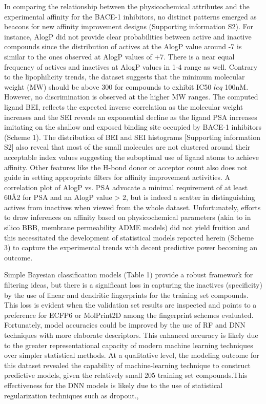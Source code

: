 In comparing the relationship between the physicochemical attributes and the experimental affinity for the BACE-1 inhibitors, no distinct patterns emerged as beacons for new affinity improvement designs (Supporting information S2).  For instance, AlogP did not provide clear probabilities between active and inactive compounds since the distribution of actives at the AlogP value around -7 is similar to the ones observed at AlogP values of +7.  There is a near equal frequency of actives and inactives at AlogP values in 1-4 range as well.  Contrary to the lipophilicity trends, the dataset suggests that the minimum molecular weight (MW) should be above 300 for compounds to exhibit IC50 $leq$ 100nM.  However, no discrimination is observed at the higher MW ranges.  The computed ligand BEI, reflects the expected inverse correlation as the molecular weight increases and the SEI reveals an exponential decline as the ligand PSA increases imitating on the shallow and exposed binding site occupied by BACE-1 inhibitors (Scheme 1).  The distribution of BEI and SEI histograms [Supporting information S2] also reveal that most of the small molecules are not clustered around their acceptable index values suggesting the suboptimal use of ligand atoms to achieve affinity.  Other features like the H-bond donor or acceptor count also does not guide in setting appropriate filters for affinity improvement activities.  A correlation plot of AlogP vs. PSA advocate a minimal requirement of at least 60Å2 for PSA and an AlogP value > 2, but is indeed a scatter in distinguishing actives from inactives when viewed from the whole dataset.  Unfortunately, efforts to draw inferences on affinity based on physicochemical parameters (akin to in silico BBB, membrane permeability ADME models) did not yield fruition and this necessitated the development of statistical models reported herein (Scheme 3) to capture the experimental trends with decent predictive power becoming an outcome.

Simple Bayesian classification models (Table 1) provide a robust framework for filtering ideas, but there is a significant loss in capturing the inactives (specificity) by the use of linear and dendritic fingerprints for the training set compounds.  This loss is evident when the validation set results are inspected and points to a preference for ECFP6 or MolPrint2D among the fingerprint schemes evaluated.  Fortunately, model accuracies could be improved by the use of RF and DNN techniques with more elaborate descriptors.  This enhanced accuracy is likely due to the greater representational capacity of modern machine learning techniques over simpler statistical methods.  At a qualitative level, the modeling outcome for this dataset revealed the capability of machine-learning technique to construct predictive models, given the relatively small 205 training set compounds.This effectiveness for the DNN models is likely due to the use of statistical regularization techniques such as dropout.,


